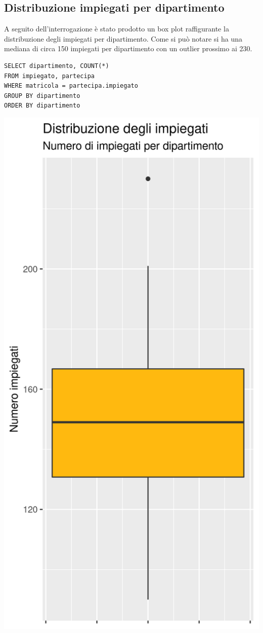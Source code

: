 \documentclass{article}
\begin{document}
\subsection{Distribuzione impiegati per dipartimento}
A seguito dell'interrogazione è stato prodotto un box plot raffigurante la distribuzione degli impiegati per dipartimento.
\newline
Come si può notare si ha una mediana di circa 150 impiegati per dipartimento con un outlier prossimo ai 230.
\begin{verbatim}
SELECT dipartimento, COUNT(*) 
FROM impiegato, partecipa 
WHERE matricola = partecipa.impiegato 
GROUP BY dipartimento 
ORDER BY dipartimento
\end{verbatim}
\begin{center}
\includegraphics[width=.5\textwidth]{plot_dist_impiegati_dipartimento.png}
\end{center}

\newpage
\end{document}
